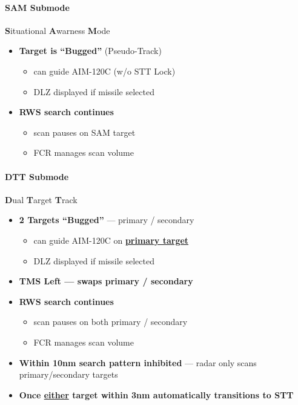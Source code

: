 \paragraph{SAM Submode}
\textbf{S}ituational \textbf{A}warness \textbf{M}ode

\begin{itemize}
    \item \textbf{Target is ``Bugged''} (Pseudo-Track)
    \begin{itemize}
        \item can guide AIM-120C (w/o STT Lock)
        \item DLZ displayed if missile selected
    \end{itemize}
    \item \textbf{RWS search  continues}
    \begin{itemize}
        \item scan pauses on SAM target
        \item FCR manages scan volume
    \end{itemize}
\end{itemize}

\paragraph{DTT Submode}
\textbf{D}ual \textbf{T}arget \textbf{T}rack

\begin{itemize}
    \item \textbf{2 Targets ``Bugged''} --- primary / secondary
    \begin{itemize}
        \item can guide AIM-120C on \textbf{\underline{primary target}}
        \item DLZ displayed if missile selected
    \end{itemize}
    \item \textbf{TMS Left --- swaps primary / secondary}
    \item \textbf{RWS search  continues}
    \begin{itemize}
        \item scan pauses on both primary / secondary
        \item FCR manages scan volume
    \end{itemize}
    \item \textbf{Within 10nm search pattern inhibited} --- radar only scans primary/secondary targets
    \item \textbf{Once \underline{either} target within 3nm automatically transitions to STT}
\end{itemize}


